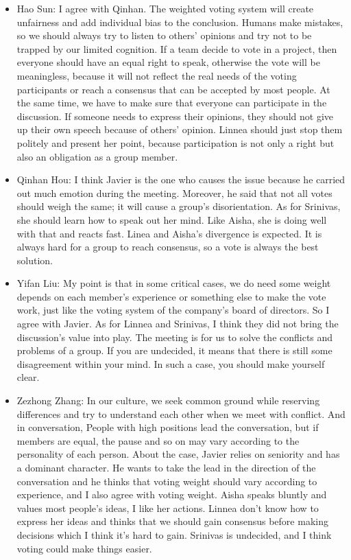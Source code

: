 		\begin{itemize}
  			\item Hao Sun: I agree with Qinhan. The weighted voting system will create unfairness and add individual bias to the conclusion. Humans make mistakes, so we should always try to listen to others' opinions and try not to be trapped by our limited cognition. If a team decide to vote in a project, then everyone should have an equal right to speak, otherwise the vote will be meaningless, because it will not reflect the real needs of the voting participants or reach a consensus that can be accepted by most people. At the same time, we have to make sure that everyone can participate in the discussion. If someone needs to express their opinions, they should not give up their own speech because of others' opinion. Linnea should just stop them politely and present her point, because participation is not only a right but also an obligation as a group member.
  			\item Qinhan Hou: I think Javier is the one who causes the issue because he carried out much emotion during the meeting. Moreover, he said that not all votes should weigh the same; it will cause a group's disorientation.  As for Srinivas, she should learn how to speak out her mind. Like Aisha, she is doing well with that and reacts fast. Linea and Aisha's divergence is expected. It is always hard for a group to reach consensus, so a vote is always the best solution.
  			\item Yifan Liu: My point is that in some critical cases, we do need some weight depends on each member's experience or something else to make the vote work, just like the voting system of the company's board of directors. So I agree with Javier. As for Linnea and Srinivas, I think they did not bring the discussion's value into play. The meeting is for us to solve the conflicts and problems of a group. If you are undecided, it means that there is still some disagreement within your mind. In such a case, you should make yourself clear.
  			\item Zezhong Zhang: In our culture, we seek common ground while reserving differences and try to understand each other when we meet with conflict. And in conversation, People with high positions lead the conversation, but if members are equal, the pause and so on may vary according to the personality of each person. About the case, Javier relies on seniority and has a dominant character. He wants to take the lead in the direction of the conversation and he thinks that voting weight should vary according to experience, and I also agree with voting weight. Aisha speaks bluntly and values most people’s ideas, I like her actions. Linnea don't know how to express her ideas and thinks that we should gain consensus before making decisions which I think it's hard to gain. Srinivas is undecided, and I think voting could make things easier. 
		\end{itemize}
